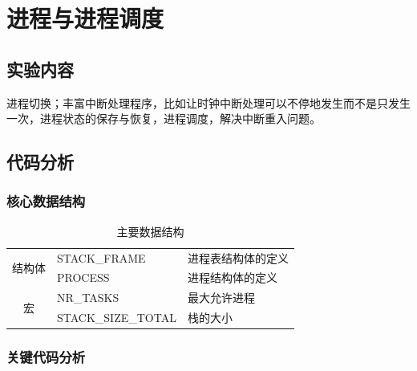 \chapter{进程与进程调度}\label{cha:latex-brief-intro}

\section{实验内容}
进程切换；丰富中断处理程序，比如让时钟中断处理可以不停地发生而不是只发生一次，进程状态的保存与恢复，进程调度，解决中断重入问题。

\section{代码分析}

\subsection{核心数据结构}

\begin{table}[H]
\begin{center}
\caption{主要数据结构}
\begin{tabular}{|c|l|l|}
\hline
\multirow{2}{*}{结构体} & STACK\_FRAME       & 进程表结构体的定义 \\ \cline{2-3} 
                     & PROCESS            & 进程结构体的定义  \\ \hline
\multirow{2}{*}{宏}   & NR\_TASKS          & 最大允许进程  \\ \cline{2-3} 
                     & STACK\_SIZE\_TOTAL & 栈的大小      \\ \hline
\end{tabular}
\end{center}
\end{table}


\subsection{关键代码分析}

